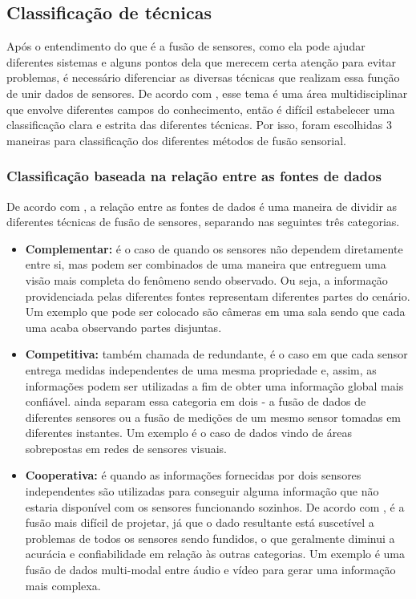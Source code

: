 \documentclass[acronym, symbols, table]{fei}
\begin{document}
		\subsection{Classificação de técnicas}
			Após o entendimento do que é a fusão de sensores, como ela pode ajudar diferentes sistemas e alguns pontos dela que merecem certa atenção para evitar problemas, é necessário diferenciar as diversas técnicas que realizam essa função de unir dados de sensores. De acordo com \textcite{castanedo2013review}, esse tema é uma área multidisciplinar que envolve diferentes campos do conhecimento, então é difícil estabelecer uma classificação clara e estrita das diferentes técnicas. Por isso, foram escolhidas 3 maneiras para classificação dos diferentes métodos de fusão sensorial.
			
			\subsubsection{Classificação baseada na relação entre as fontes de dados}
				De acordo com \textcite{castanedo2013review}, a relação entre as fontes de dados é uma maneira de dividir as diferentes técnicas de fusão de sensores, separando nas seguintes três categorias.
				
				\begin{itemize}
					\item \textbf{Complementar:} é o caso de quando os sensores não dependem diretamente entre si, mas podem ser combinados de uma maneira que entreguem uma visão mais completa do fenômeno sendo observado. Ou seja, a informação providenciada pelas diferentes fontes representam diferentes partes do cenário. Um exemplo que pode ser colocado são câmeras em uma sala sendo que cada uma acaba observando partes disjuntas.
					
					\item \textbf{Competitiva:} também chamada de redundante, é o caso em que cada sensor entrega medidas independentes de uma mesma propriedade e, assim, as informações podem ser utilizadas a fim de obter uma informação global mais confiável. \textcite{visser1999organisation} ainda separam essa categoria em dois - a fusão de dados de diferentes sensores ou a fusão de medições de um mesmo sensor tomadas em diferentes instantes. Um exemplo é o caso de dados vindo de áreas sobrepostas em redes de sensores visuais.
					
					\item \textbf{Cooperativa:} é quando as informações fornecidas por dois sensores independentes são utilizadas para conseguir alguma informação que não estaria disponível com os sensores funcionando sozinhos. De acordo com \textcite{brooks1998multi}, é a fusão mais difícil de projetar, já que o dado resultante está suscetível a problemas de todos os sensores sendo fundidos, o que geralmente diminui a acurácia e confiabilidade em relação às outras categorias. Um exemplo é uma fusão de dados multi-modal entre áudio e vídeo para gerar uma informação mais complexa.
				\end{itemize}
				
\end{document}
